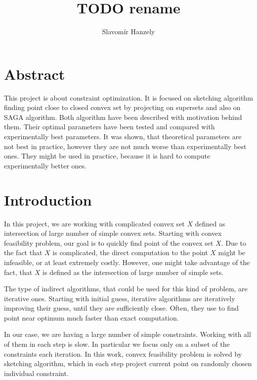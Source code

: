 \documentclass[11pt]{book}
\begin{document}
\title{\textbf{TODO rename}}
\author{Slavomír Hanzely}
\maketitle

\chapter*{\centering Abstract}

This project is about constraint optimization. It is focused on sketching algorithm finding point close to closed convex set by projecting on supersets and also on SAGA algorithm. Both algorithm have been described with motivation behind them. Their optimal parameters have been tested and compared with experimentally best parameters. It was shown, that theoretical parameters are not best in practice, however they are not much worse than experimentally best ones. They might be used in practice, because it is hard to compute experimentally better ones.

\tableofcontents

\chapter{Introduction}

In this project, we are working with complicated convex set $X$ defined as intersection of large number of simple convex sets. Starting with convex feasibility problem, our goal is to quickly find point of the convex set $X$. Due to the fact that $X$ is complicated, the direct computation to the point $X$ might be infeasible, or at least extremely costly. However, one might take advantage of the fact, that $X$ is defined as the intersection of large number of simple sets.

The type of indirect algorithms, that could be used for this kind of problem, are iterative ones. Starting with initial guess, iterative algorithms are iteratively improving their guess, until they are sufficiently close. Often, they use to find point near optimum much faster than exact computation.

In our case, we are having a large number of simple constraints. Working with all of them in each step is slow. In particular we focus only on a subset of the constraints each iteration. In this work, convex feasibility problem is solved by sketching algorithm, which in each step project current point on randomly chosen individual constraint\cite{sketchAndProject,projectionFeasibility}.\\
\end{document}
